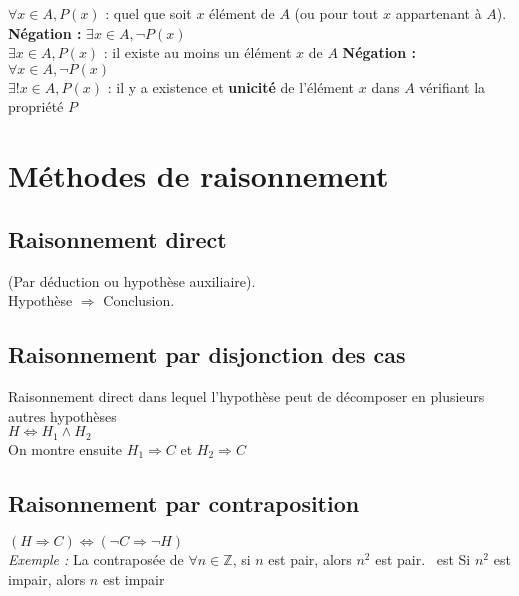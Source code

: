      $\forall x \in A, P(x)$ : quel que soit $x$ élément de $A$ (ou pour tout $x$ appartenant à $A$). \hfill \textbf{Négation :} $\exists x \in A, \neg P(x)$\\
      $\exists x \in A, P(x)$ : il existe au moins un élément $x$ de $A$ \hfill \textbf{Négation :} $\forall x \in A, \neg P(x)$\\
      $\exists !x \in A, P(x)$ : il y a existence et \textbf{unicité} de l'élément $x$ dans $A$ vérifiant la propriété $P$


  \section{Méthodes de raisonnement}\label{sec:methodes-de-raisonnement}

    \begin{multicols}{2}
      \raggedcolumns

      \subsection{Raisonnement direct}\label{subsec:raisonnement-direct}

        (Par déduction ou hypothèse auxiliaire).\\
        Hypothèse $\Rightarrow$ Conclusion.

      \subsection{Raisonnement par disjonction des cas}\label{subsec:raisonnement-par-disjonction-des-cas}

        Raisonnement direct dans lequel l'hypothèse peut de décomposer en plusieurs autres hypothèses\\
        $H \Leftrightarrow H_1 \land H_2$\\
        On montre ensuite $H_1 \Rightarrow C$ et $H_2 \Rightarrow C$

      \subsection{Raisonnement par contraposition}\label{subsec:raisonnement-par-contraposition}

        $(H \Rightarrow C) \Leftrightarrow (\neg C \Rightarrow \neg H)$\\
        \textit{Exemple :} La contraposée de \og $\forall n \in \mathbb{Z}$, si $n$ est pair, alors $n^2$ est pair. \fg\ est \og Si $n^2$ est impair, alors $n$ est impair \fg


\end{multicols}
